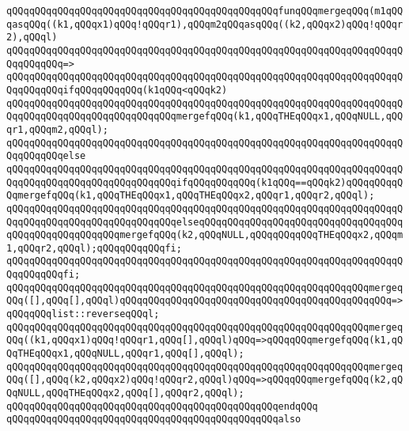 \verb|qQQqqQQqqQQqqQQqqQQqqQQqqQQqqQQqqQQqqQQqqQQqqQQqfunqQQqmergeqQQq(m1qQQqasqQQq((k1,qQQqx1)qQQq!qQQqr1),qQQqm2qQQqasqQQq((k2,qQQqx2)qQQq!qQQqr2),qQQql)|\newline
\verb|qQQqqQQqqQQqqQQqqQQqqQQqqQQqqQQqqQQqqQQqqQQqqQQqqQQqqQQqqQQqqQQqqQQqqQQqqQQqqQQq=>|\newline
\verb|qQQqqQQqqQQqqQQqqQQqqQQqqQQqqQQqqQQqqQQqqQQqqQQqqQQqqQQqqQQqqQQqqQQqqQQqqQQqqQQqifqQQqqQQqqQQq(k1qQQq<qQQqk2)|\newline
\newline
\verb|qQQqqQQqqQQqqQQqqQQqqQQqqQQqqQQqqQQqqQQqqQQqqQQqqQQqqQQqqQQqqQQqqQQqqQQqqQQqqQQqqQQqqQQqqQQqqQQqqQQqmergefqQQq(k1,qQQqTHEqQQqx1,qQQqNULL,qQQqr1,qQQqm2,qQQql);|\newline
\verb|qQQqqQQqqQQqqQQqqQQqqQQqqQQqqQQqqQQqqQQqqQQqqQQqqQQqqQQqqQQqqQQqqQQqqQQqqQQqqQQqelse|\newline
\verb|qQQqqQQqqQQqqQQqqQQqqQQqqQQqqQQqqQQqqQQqqQQqqQQqqQQqqQQqqQQqqQQqqQQqqQQqqQQqqQQqqQQqqQQqqQQqqQQqqQQqifqQQqqQQqqQQq(k1qQQq==qQQqk2)qQQqqQQqqQQqmergefqQQq(k1,qQQqTHEqQQqx1,qQQqTHEqQQqx2,qQQqr1,qQQqr2,qQQql);|\newline
\verb|qQQqqQQqqQQqqQQqqQQqqQQqqQQqqQQqqQQqqQQqqQQqqQQqqQQqqQQqqQQqqQQqqQQqqQQqqQQqqQQqqQQqqQQqqQQqqQQqqQQqelseqQQqqQQqqQQqqQQqqQQqqQQqqQQqqQQqqQQqqQQqqQQqqQQqqQQqqQQqmergefqQQq(k2,qQQqNULL,qQQqqQQqqQQqTHEqQQqx2,qQQqm1,qQQqr2,qQQql);qQQqqQQqqQQqfi;|\newline
\verb|qQQqqQQqqQQqqQQqqQQqqQQqqQQqqQQqqQQqqQQqqQQqqQQqqQQqqQQqqQQqqQQqqQQqqQQqqQQqqQQqfi;|\newline
\newline
\verb|qQQqqQQqqQQqqQQqqQQqqQQqqQQqqQQqqQQqqQQqqQQqqQQqqQQqqQQqqQQqqQQqmergeqQQq([],qQQq[],qQQql)qQQqqQQqqQQqqQQqqQQqqQQqqQQqqQQqqQQqqQQqqQQqqQQq=>qQQqqQQqlist::reverseqQQql;|\newline
\verb|qQQqqQQqqQQqqQQqqQQqqQQqqQQqqQQqqQQqqQQqqQQqqQQqqQQqqQQqqQQqqQQqmergeqQQq((k1,qQQqx1)qQQq!qQQqr1,qQQq[],qQQql)qQQq=>qQQqqQQqmergefqQQq(k1,qQQqTHEqQQqx1,qQQqNULL,qQQqr1,qQQq[],qQQql);|\newline
\verb|qQQqqQQqqQQqqQQqqQQqqQQqqQQqqQQqqQQqqQQqqQQqqQQqqQQqqQQqqQQqqQQqmergeqQQq([],qQQq(k2,qQQqx2)qQQq!qQQqr2,qQQql)qQQq=>qQQqqQQqmergefqQQq(k2,qQQqNULL,qQQqTHEqQQqx2,qQQq[],qQQqr2,qQQql);|\newline
\verb|qQQqqQQqqQQqqQQqqQQqqQQqqQQqqQQqqQQqqQQqqQQqqQQqendqQQq|\newline
\newline
\verb|qQQqqQQqqQQqqQQqqQQqqQQqqQQqqQQqqQQqqQQqqQQqqQQqalso|\newline
